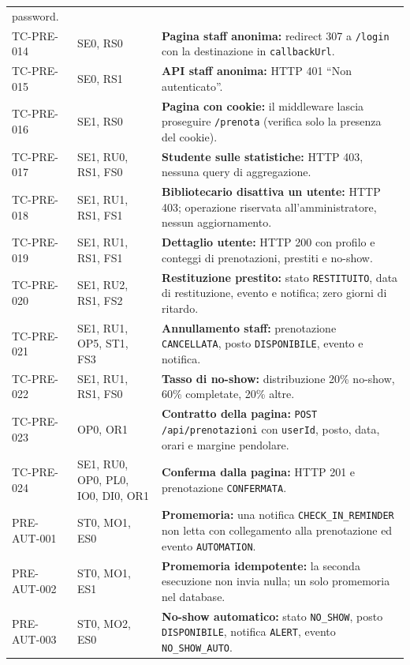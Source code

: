 \documentclass[11pt,a4paper,oneside,openany]{book}
\begin{document}
{\begin{xltabular}{\linewidth}{L{2.4cm}L{3.4cm}Y}
  password. \\
  TC-PRE-014 & SE0, RS0 &
  \textbf{Pagina staff anonima:} redirect 307 a \texttt{/login} con la
  destinazione in \texttt{callbackUrl}. \\
  TC-PRE-015 & SE0, RS1 &
  \textbf{API staff anonima:} HTTP 401 \enquote{Non autenticato}. \\
  TC-PRE-016 & SE1, RS0 &
  \textbf{Pagina con cookie:} il middleware lascia proseguire
  \texttt{/prenota} (verifica solo la presenza del cookie). \\
  TC-PRE-017 & SE1, RU0, RS1, FS0 &
  \textbf{Studente sulle statistiche:} HTTP 403, nessuna query di
  aggregazione. \\
  TC-PRE-018 & SE1, RU1, RS1, FS1 &
  \textbf{Bibliotecario disattiva un utente:} HTTP 403; operazione riservata
  all'amministratore, nessun aggiornamento. \\
  TC-PRE-019 & SE1, RU1, RS1, FS1 &
  \textbf{Dettaglio utente:} HTTP 200 con profilo e conteggi di
  prenotazioni, prestiti e no-show. \\
  TC-PRE-020 & SE1, RU2, RS1, FS2 &
  \textbf{Restituzione prestito:} stato \texttt{RESTITUITO}, data di
  restituzione, evento e notifica; zero giorni di ritardo. \\
  TC-PRE-021 & SE1, RU1, OP5, ST1, FS3 &
  \textbf{Annullamento staff:} prenotazione \texttt{CANCELLATA}, posto
  \texttt{DISPONIBILE}, evento e notifica. \\
  TC-PRE-022 & SE1, RU1, RS1, FS0 &
  \textbf{Tasso di no-show:} distribuzione 20\% no-show, 60\% completate,
  20\% altre. \\
  TC-PRE-023 & OP0, OR1 &
  \textbf{Contratto della pagina:} \texttt{POST /api/prenotazioni} con
  \texttt{userId}, posto, data, orari e margine pendolare. \\
  TC-PRE-024 & SE1, RU0, OP0, PL0, IO0, DI0, OR1 &
  \textbf{Conferma dalla pagina:} HTTP 201 e prenotazione
  \texttt{CONFERMATA}. \\
  PRE-AUT-001 & ST0, MO1, ES0 &
  \textbf{Promemoria:} una notifica \texttt{CHECK\_IN\_REMINDER} non letta
  con collegamento alla prenotazione ed evento \texttt{AUTOMATION}. \\
  PRE-AUT-002 & ST0, MO1, ES1 &
  \textbf{Promemoria idempotente:} la seconda esecuzione non invia nulla; un
  solo promemoria nel database. \\
  PRE-AUT-003 & ST0, MO2, ES0 &
  \textbf{No-show automatico:} stato \texttt{NO\_SHOW}, posto
  \texttt{DISPONIBILE}, notifica \texttt{ALERT}, evento
  \texttt{NO\_SHOW\_AUTO}. \\

\end{xltabular}}
\end{document}
